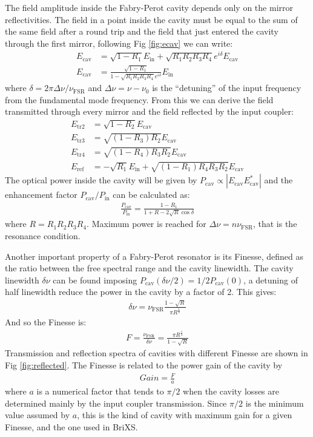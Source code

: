 The field amplitude inside the Fabry-Perot cavity depends only on the mirror reflectivities. The field in a point inside the cavity must be equal to the sum of the same field after a round trip and the field that just entered the cavity through the first mirror, following Fig \ref{fig:ecav} we can write:
\begin{align}
	E_{\mathrm{cav}} &= \sqrt{1-R_1} E_{\mathrm{in}} +\sqrt{R_1R_2R_3R_4}e^{i\delta}E_{\mathrm{cav}} \\
	E_{\mathrm{cav}} &= \frac{\sqrt{1-R_1}}{1-\sqrt{R_1R_2R_3R_4}e^{i\delta}} E_{\mathrm{in}}
\end{align}
where $\delta=2\pi\Delta\nu/\nu_{\mathrm{FSR}}$ and $\Delta\nu=\nu-\nu_0$ is the ``detuning'' of the input frequency from the fundamental mode frequency.
From this we can derive the field transmitted through every mirror and the field reflected by the input coupler:
\begin{align}
E_{\mathrm{tr2}} &=  \sqrt{1-R_2}E_{\mathrm{cav}}\\
E_{\mathrm{tr3}} &=  \sqrt{(1-R_3)R_2}E_{\mathrm{cav}}\\
E_{\mathrm{tr4}} &=  \sqrt{(1-R_4)R_3R_2}E_{\mathrm{cav}}\\
E_{\mathrm{ref}} &=	 -\sqrt{R_1}E_{\mathrm{in}}+	\sqrt{(1-R_1)R_4R_3R_2}E_{\mathrm{cav}} \label{eq:ref}
\end{align}
The optical power inside the cavity will be given by $P_{\mathrm{cav}}\propto|E_{\mathrm{cav}}E_{\mathrm{cav}}^*|$ and the enhancement factor $P_{\mathrm{cav}}/P_{\mathrm{in}}$ can be calculated as:
\begin{align}
\frac {P_{\mathrm{cav}}}{P_{\mathrm{in}}} = \frac{1-R_1}{1+R-2\sqrt{R}\cos\delta}
\label{eq:power}
\end{align}
where $R=R_1R_2R_3R_4$.
Maximum power is reached for $\Delta\nu = n\nu_{\mathrm{FSR}}$, that is the resonance condition.

Another important property of a Fabry-Perot resonator is its Finesse, defined as the ratio between the free spectral range and the cavity linewidth. The cavity linewidth $\delta\nu$ can be found imposing $P_\mathrm{cav}(\delta\nu/2) = 1/2 P_\mathrm{cav}(0)$, a detuning of half linewidth reduce the power in the cavity by a factor of 2. This gives:
\begin{align}
\delta\nu = \nu_\mathrm{FSR} \frac{1-\sqrt{R}}{\pi R^{\frac{1}{4}}}
\end{align}
And so the Finesse is:
\begin{align}
	F = \frac{\nu_\mathrm{FSR}}{\delta\nu} = \frac{\pi R^{\frac{1}{4}}}{1-\sqrt{R}}
	\label{eq:finesse}
\end{align}
Transmission and reflection spectra of cavities with different Finesse are shown in Fig \ref{fig:reflected}.
The Finesse is related to the power gain of the cavity by
\begin{align}
	Gain = \frac{F}{a}
\end{align}
where $a$ is a numerical factor that tends to $\pi/2$ when the cavity losses are determined mainly by the input coupler transmission. Since $\pi/2$ is the minimum value assumed by $a$, this is the kind of cavity with maximum gain for a given Finesse, and the one used in BriXS. 

